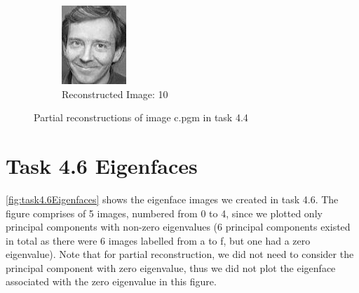 \documentclass[12pt]{article}
\begin{document}
\begin{figure}
\begin{subfigure}[b]{0.20\textwidth}
		\includegraphics[width=\textwidth]{Task4.3_Images/ReconstructedImage10.jpg}
		\caption{Reconstructed Image: 10}
	\end{subfigure}\quad
	\caption[Plots of partial reconstructions of image c.pgm in task 4.4]{\label{fig:task4.4ReconstructedImages} Partial reconstructions of image c.pgm in task 4.4}
\end{figure}


\newpage
\thispagestyle{plain}
\mbox{}

\section {Task 4.6 Eigenfaces}
\label{sec:task4.6Eigenfaces}

\cref{fig:task4.6Eigenfaces} shows the eigenface images we created in task 4.6. The figure comprises of 5 images, numbered from 0 to 4, since we plotted only principal components with non-zero eigenvalues (6 principal components existed in total as there were 6 images labelled from a to f, but one had a zero eigenvalue). Note that for partial reconstruction, we did not need to consider the principal component with zero eigenvalue, thus we did not plot the eigenface associated with the zero eigenvalue in this figure.
\end{document}

